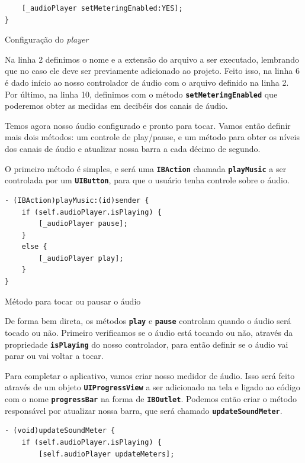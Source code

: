 \documentclass[a4paper,12pt,brazil,doubleside]{book}
\begin{document}
\begin{singlespace}
\begin{listing}[H]
\begin{verbatim}
    [_audioPlayer setMeteringEnabled:YES];
}
\end{verbatim}
\caption{Configuração do \emph{player}}
\end{listing}


Na linha 2 definimos o nome e a extensão do arquivo a ser executado, lembrando que no caso ele deve ser previamente adicionado ao projeto. Feito isso, na linha 6 é dado início ao nosso controlador de áudio com o arquivo definido na linha 2. Por último, na linha 10, definimos com o método \texttt{\textbf{setMeteringEnabled}} que poderemos obter as medidas em decibéis dos canais de áudio.

Temos agora nosso áudio configurado e pronto para tocar. Vamos então definir mais dois métodos: um controle de play/pause, e um método para obter os níveis dos canais de áudio e atualizar nossa barra a cada décimo de segundo.

O primeiro método é simples, e será uma \texttt{\textbf{IBAction}} chamada \texttt{\textbf{playMusic}} a ser controlada por um \texttt{\textbf{UIButton}}, para que o usuário tenha controle sobre o áudio.

\begin{listing}[H]
\begin{verbatim}
- (IBAction)playMusic:(id)sender {
    if (self.audioPlayer.isPlaying) {
        [_audioPlayer pause];
    }
    else {
        [_audioPlayer play];
    }
}
\end{verbatim}
\caption{Método para tocar ou pausar o áudio}
\end{listing}


De forma bem direta, os métodos \texttt{\textbf{play}} e \texttt{\textbf{pause}} controlam quando o áudio será tocado ou não. Primeiro verificamos se o áudio está tocando ou não, através da propriedade \texttt{\textbf{isPlaying}} do nosso controlador, para então definir se o áudio vai parar ou vai voltar a tocar.

Para completar o aplicativo, vamos criar nosso medidor de áudio. Isso será feito através de um objeto \texttt{\textbf{UIProgressView}} a ser adicionado na tela e ligado ao código com o nome \texttt{\textbf{progressBar}} na forma de \texttt{\textbf{IBOutlet}}. Podemos então criar o método responsável por atualizar nossa barra, que será chamado \texttt{\textbf{updateSoundMeter}}.

\begin{listing}[H]
\begin{verbatim}
- (void)updateSoundMeter {
    if (self.audioPlayer.isPlaying) {
        [self.audioPlayer updateMeters];
    

\end{verbatim}
\end{listing}
\end{singlespace}
\end{document}
